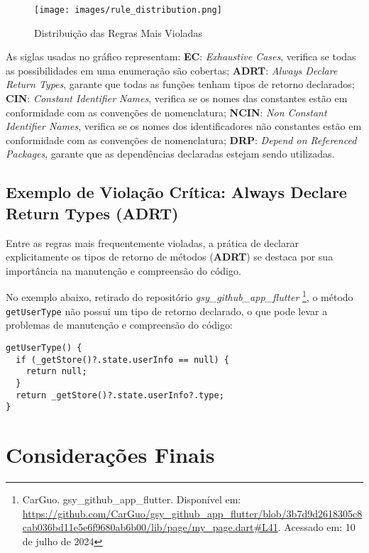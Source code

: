 \documentclass[12pt]{article}
\begin{document}
\begin{figure}[H]
\centering
\texttt{[image: images/rule\_distribution.png]}
\caption{Distribuição das Regras Mais Violadas}
\label{fig:rule_distribution}
\end{figure}

As siglas usadas no gráfico representam: \textbf{EC}: \textit{Exhaustive Cases}, verifica se todas as possibilidades em uma enumeração são cobertas; \textbf{ADRT}: \textit{Always Declare Return Types}, garante que todas as funções tenham tipos de retorno declarados; \textbf{CIN}: \textit{Constant Identifier Names}, verifica se os nomes das constantes estão em conformidade com as convenções de nomenclatura; \textbf{NCIN}: \textit{Non Constant Identifier Names}, verifica se os nomes dos identificadores não constantes estão em conformidade com as convenções de nomenclatura; \textbf{DRP}: \textit{Depend on Referenced Packages}, garante que as dependências declaradas estejam sendo utilizadas.

\subsection{Exemplo de Violação Crítica: Always Declare Return Types (ADRT)}
Entre as regras mais frequentemente violadas, a prática de declarar explicitamente os tipos de retorno de métodos (\textbf{ADRT}) se destaca por sua importância na manutenção e compreensão do código.

No exemplo abaixo, retirado do repositório \textit{gsy\_github\_app\_flutter} \footnote{CarGuo. gsy\_github\_app\_flutter. Disponível em: \url{https://github.com/CarGuo/gsy\_github_app\_flutter/blob/3b7d9d2618305c8cab036bd11e5e6f9680ab6b00/lib/page/my\_page.dart#L41}. Acessado em: 10 de julho de 2024}, o método \texttt{getUserType}  não possui um tipo de retorno declarado, o que pode levar a problemas de manutenção e compreensão do código:

\begin{tcolorbox}[codeSnippetStyle={gsy\_github\_app\_flutter/lib/page/my\_page.dart}]
\begin{verbatim}
getUserType() {
  if (_getStore()?.state.userInfo == null) {
    return null;
  }
  return _getStore()?.state.userInfo?.type;
}
\end{verbatim}
\end{tcolorbox}

\section{Considerações Finais}
\end{document}
